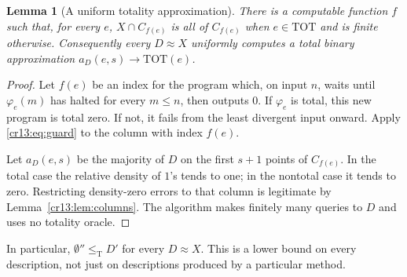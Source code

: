 \documentclass[11pt,letterpaper]{article}
\newtheorem{lemma}[theorem]{Lemma}
\theoremstyle{definition}
\theoremstyle{remark}\newtheorem{remark}[theorem]{Remark}
\numberwithin{equation}{section}
\newcommand{\leT}{\leq_{\mathrm T}}
\newcommand{\TOT}{\mathrm{TOT}}
\begin{document}
\begin{lemma}[A uniform totality approximation]\label{cr13:lem:totfromX}
There is a computable function $f$ such that, for every $e$, $X\cap C_{f(e)}$ is all of $C_{f(e)}$ when $e\in\TOT$ and is finite otherwise. Consequently every $D\approx X$ uniformly computes a total binary approximation $a_D(e,s)\to\TOT(e)$.
\end{lemma}
\begin{proof}
Let $f(e)$ be an index for the program which, on input $n$, waits until $\varphi_e(m)$ has halted for every $m\le n$, then outputs $0$. If $\varphi_e$ is total, this new program is total zero. If not, it fails from the least divergent input onward. Apply \eqref{cr13:eq:guard} to the column with index $f(e)$.

Let $a_D(e,s)$ be the majority of $D$ on the first $s+1$ points of $C_{f(e)}$. In the total case the relative density of $1$'s tends to one; in the nontotal case it tends to zero. Restricting density-zero errors to that column is legitimate by Lemma~\ref{cr13:lem:columns}. The algorithm makes finitely many queries to $D$ and uses no totality oracle.
\end{proof}
In particular, $\emptyset''\leT D'$ for every $D\approx X$. This is a lower bound on every description, not just on descriptions produced by a particular method.
\end{document}
